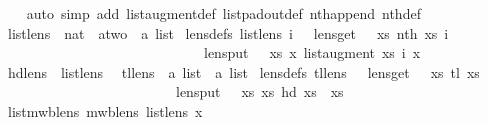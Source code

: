 \begin{isabellebody}
%
\isadelimproof
\ \ %
\endisadelimproof
%
\isatagproof
{}\isamarkupfalse%
\ {\isacharparenleft}auto\ simp\ add{\isacharcolon}\ list{\isacharunderscore}augment{\isacharunderscore}def\ list{\isacharunderscore}pad{\isacharunderscore}out{\isacharunderscore}def\ nth{\isacharunderscore}append\ nth{\isacharprime}{\isacharunderscore}def{\isacharparenright}%
\endisatagproof
{\isafoldproof}%
%
\isadelimproof
\isanewline
%
\endisadelimproof
\isanewline
{}\isamarkupfalse%
\ list{\isacharunderscore}lens\ {\isacharcolon}{\isacharcolon}\ {\isachardoublequoteopen}nat\ {\isasymRightarrow}\ {\isacharparenleft}{\isacharprime}a{\isacharcolon}{\isacharcolon}two\ {\isasymLongrightarrow}\ {\isacharprime}a\ list{\isacharparenright}{\isachardoublequoteclose}\ \isanewline
{\isacharbrackleft}lens{\isacharunderscore}defs{\isacharbrackright}{\isacharcolon}\ {\isachardoublequoteopen}list{\isacharunderscore}lens\ i\ {\isacharequal}\ {\isasymlparr}\ lens{\isacharunderscore}get\ {\isacharequal}\ {\isacharparenleft}{\isasymlambda}\ xs{\isachardot}\ nth{\isacharprime}\ xs\ i{\isacharparenright}\isanewline
\ \ \ \ \ \ \ \ \ \ \ \ \ \ \ \ \ \ \ \ \ \ \ \ \ \ \ \ {\isacharcomma}\ lens{\isacharunderscore}put\ {\isacharequal}\ {\isacharparenleft}{\isasymlambda}\ xs\ x{\isachardot}\ list{\isacharunderscore}augment\ xs\ i\ x{\isacharparenright}\ {\isasymrparr}{\isachardoublequoteclose}\isanewline
\isanewline
{}\isamarkupfalse%
\ {\isachardoublequoteopen}hd{\isacharunderscore}lens\ {\isasymequiv}\ list{\isacharunderscore}lens\ {}{\isachardoublequoteclose}\isanewline
\isanewline
{}\isamarkupfalse%
\ tl{\isacharunderscore}lens\ {\isacharcolon}{\isacharcolon}\ {\isachardoublequoteopen}{\isacharprime}a\ list\ {\isasymLongrightarrow}\ {\isacharprime}a\ list{\isachardoublequoteclose}\ \isanewline
{\isacharbrackleft}lens{\isacharunderscore}defs{\isacharbrackright}{\isacharcolon}\ {\isachardoublequoteopen}tl{\isacharunderscore}lens\ {\isacharequal}\ {\isasymlparr}\ lens{\isacharunderscore}get\ {\isacharequal}\ {\isacharparenleft}{\isasymlambda}\ xs{\isachardot}\ tl\ xs{\isacharparenright}\isanewline
\ \ \ \ \ \ \ \ \ \ \ \ \ \ \ \ \ \ \ \ \ \ \ \ {\isacharcomma}\ lens{\isacharunderscore}put\ {\isacharequal}\ {\isacharparenleft}{\isasymlambda}\ xs\ xs{\isacharprime}{\isachardot}\ hd\ xs\ {\isacharhash}\ xs{\isacharprime}{\isacharparenright}\ {\isasymrparr}{\isachardoublequoteclose}\isanewline
\isanewline
{}\isamarkupfalse%
\ list{\isacharunderscore}mwb{\isacharunderscore}lens{\isacharcolon}\ {\isachardoublequoteopen}mwb{\isacharunderscore}lens\ {\isacharparenleft}list{\isacharunderscore}lens\ x{\isacharparenright}{\isachardoublequoteclose}\isanewline

\end{isabellebody}

